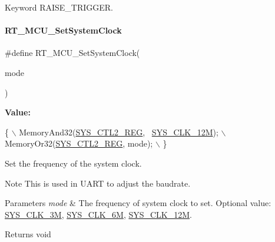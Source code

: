Keyword R\+A\+I\+S\+E\+\_\+\+T\+R\+I\+G\+G\+ER. \mbox{\label{a00020_a017f8665ec51267680fc0e536db19c13}} 
\paragraph{\texorpdfstring{R\+T\+\_\+\+M\+C\+U\+\_\+\+Set\+System\+Clock}{RT\_MCU\_SetSystemClock}}
{\footnotesize\ttfamily \#define R\+T\+\_\+\+M\+C\+U\+\_\+\+Set\+System\+Clock(\begin{DoxyParamCaption}\item[{}]{mode }\end{DoxyParamCaption})}

{\bfseries Value\+:}
\begin{DoxyCode}
\{                                               \(\backslash\)
        MemoryAnd32(\mbox{\hyperlink{a00020_ae6a98a78f9ac0c75c18c7d4e2c62fdcb}{SYS\_CTL2\_REG}}, ~\mbox{\hyperlink{a00020_ab6421bc33962d86e356ed816dfac41b6}{SYS\_CLK\_12M}});    \(\backslash\)
        MemoryOr32(\mbox{\hyperlink{a00020_ae6a98a78f9ac0c75c18c7d4e2c62fdcb}{SYS\_CTL2\_REG}}, mode);             \(\backslash\)
    \}
\end{DoxyCode}


Set the frequency of the system clock. 

\begin{DoxyNote}{Note}
This is used in U\+A\+RT to adjust the baudrate. 
\end{DoxyNote}

\begin{DoxyParams}{Parameters}
{\em mode} & The frequency of system clock to set. Optional value\+: \mbox{\hyperlink{a00020_adca9cbed6d30219f8812ba08ab0aaa7f}{S\+Y\+S\+\_\+\+C\+L\+K\+\_\+3M}}, \mbox{\hyperlink{a00020_a8ddc6e06a91f5506443cdef0458729df}{S\+Y\+S\+\_\+\+C\+L\+K\+\_\+6M}}, \mbox{\hyperlink{a00020_ab6421bc33962d86e356ed816dfac41b6}{S\+Y\+S\+\_\+\+C\+L\+K\+\_\+12M}}. \\
\hline
\end{DoxyParams}
\begin{DoxyReturn}{Returns}
void 
\end{DoxyReturn}
\mbox{\label{a00020_a5639ee9c54f77e12c49d79e44bfdf60f}} 
